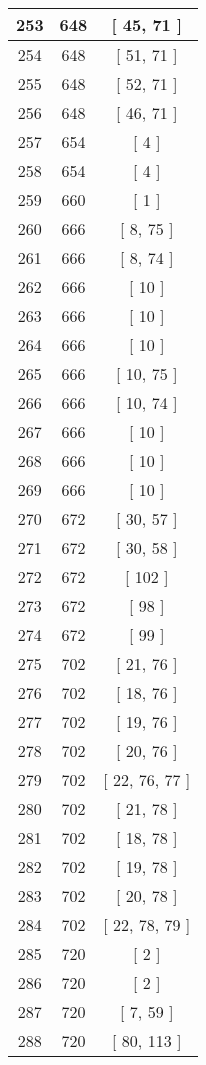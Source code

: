 \begin{center}
\begin{longtable}[H]{|| c c c ||}
\hline
253 & 648 & [ 45, 71 ] \\ 
\hline
254 & 648 & [ 51, 71 ] \\ 
\hline
255 & 648 & [ 52, 71 ] \\ 
\hline
256 & 648 & [ 46, 71 ] \\ 
\hline
257 & 654 & [ 4 ] \\ 
\hline
258 & 654 & [ 4 ] \\ 
\hline
259 & 660 & [ 1 ] \\ 
\hline
260 & 666 & [ 8, 75 ] \\ 
\hline
261 & 666 & [ 8, 74 ] \\ 
\hline
262 & 666 & [ 10 ] \\ 
\hline
263 & 666 & [ 10 ] \\ 
\hline
264 & 666 & [ 10 ] \\ 
\hline
265 & 666 & [ 10, 75 ] \\ 
\hline
266 & 666 & [ 10, 74 ] \\ 
\hline
267 & 666 & [ 10 ] \\ 
\hline
268 & 666 & [ 10 ] \\ 
\hline
269 & 666 & [ 10 ] \\ 
\hline
270 & 672 & [ 30, 57 ] \\ 
\hline
271 & 672 & [ 30, 58 ] \\ 
\hline
272 & 672 & [ 102 ] \\ 
\hline
273 & 672 & [ 98 ] \\ 
\hline
274 & 672 & [ 99 ] \\ 
\hline
275 & 702 & [ 21, 76 ] \\ 
\hline
276 & 702 & [ 18, 76 ] \\ 
\hline
277 & 702 & [ 19, 76 ] \\ 
\hline
278 & 702 & [ 20, 76 ] \\ 
\hline
279 & 702 & [ 22, 76, 77 ] \\ 
\hline
280 & 702 & [ 21, 78 ] \\ 
\hline
281 & 702 & [ 18, 78 ] \\ 
\hline
282 & 702 & [ 19, 78 ] \\ 
\hline
283 & 702 & [ 20, 78 ] \\ 
\hline
284 & 702 & [ 22, 78, 79 ] \\ 
\hline
285 & 720 & [ 2 ] \\ 
\hline
286 & 720 & [ 2 ] \\ 
\hline
287 & 720 & [ 7, 59 ] \\ 
\hline
288 & 720 & [ 80, 113 ] \\ 

\end{longtable}
\end{center}
